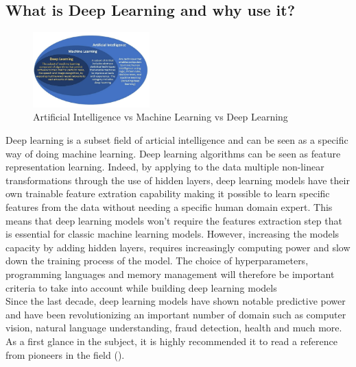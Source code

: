 \documentclass[letter]{article}\usepackage[]{graphicx}\usepackage[]{color}
\begin{document}
\subsection{What is Deep Learning and why use it?}
\begin{figure}
  \begin{center}
    \includegraphics[width=0.4\textwidth]{figure/deep learning.PNG}
      \end{center}
     \caption{Artificial Intelligence vs Machine Learning vs Deep Learning}
     \label{fig:simule}
\end{figure}

Deep learning is a subset field of articial intelligence and can be seen as a specific way of doing machine learning. Deep learning algorithms can be seen as feature representation learning. Indeed, by applying to the data multiple non-linear transformations through the use of hidden layers, deep learning models have their own trainable feature extration capability making it possible to learn specific features from the data without needing a specific human domain expert. This means that deep learning models won't require the features extraction step that is essential for classic machine learning models. However, increasing the models capacity by adding hidden layers, requires increasingly computing power and slow down the training process of the model. The choice of hyperparameters, programming languages and memory management will therefore be important criteria to take into account while building deep learning models\\
Since the last decade, deep learning models have shown notable predictive power and have been revolutionizing an important number of domain such as computer vision, natural language understanding, fraud detection, health and much more.\\
As a first glance in the subject, it is highly recommended it to read  a reference from pioneers in the field (\cite[Chapter 1]{Goodfellow-et-al-2016}).
\end{document}
